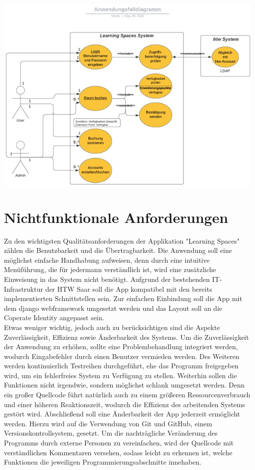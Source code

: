 \documentclass[a4paper,12pt]{article}
\begin{document}
\includegraphics{Bilder/UseCaseDiagramm}\label{UseCase}\\

\newpage

\section{Nichtfunktionale Anforderungen}
Zu den wichtigsten Qualitätsanforderungen der Applikation "Learning Spaces" zählen die Benutzbarkeit und die Übertragbarkeit. Die Anwendung soll eine möglichst einfache Handhabung aufweisen, denn durch eine intuitive Menüführung, die für jedermann verständlich ist, wird eine zusätzliche Einweisung in das System nicht benötigt. Aufgrund der bestehenden IT-Infrastruktur der HTW Saar soll die App kompatibel mit den bereits implementierten Schnittstellen sein. Zur einfachen Einbindung soll die App mit dem django webframework umgesetzt werden und das Layout soll an die Coperate Identity angepasst sein.\\ 
Etwas weniger wichtig, jedoch auch zu berücksichtigen sind die Aspekte Zuverlässigkeit, Effizienz sowie Änderbarkeit des Systems. Um die Zuverlässigkeit der Anwendung zu erhöhen, sollte eine Problembehandlung integriert werden, wodurch Eingabefehler durch einen Benutzer vermieden werden. Des Weiteren werden kontinuierlich Testreihen durchgeführt, ehe das Programm freigegeben wird, um ein fehlerfreies System zu Verfügung zu stellen. Weiterhin sollen die Funktionen nicht irgendwie, sondern möglichst schlank umgesetzt werden. Denn ein großer Quellcode führt natürlich auch zu einem größeren Ressourcenverbrauch und einer höheren Reaktionszeit, wodurch die Effizienz des arbeitenden Systems gestört wird. Abschließend soll eine Änderbarkeit der App jederzeit ermöglicht werden. Hierzu wird auf die Verwendung von Git und GitHub, einem Versionskontrollsystem, gesetzt. Um die nachträgliche Veränderung des Programms durch externe Personen zu vereinfachen, wird der Quellcode mit verständlichen Kommentaren versehen, sodass leicht zu erkennen ist, welche Funktionen die jeweiligen Programmierungsabschnitte innehaben.\\
\end{document}
